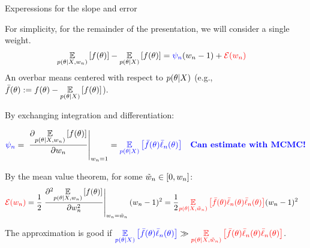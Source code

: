 \begin{frame}[t]{Experessions for the slope and error}


For simplicity, for the remainder of the presentation, we will
consider a single weight.
%
\begin{align*}
%
\expect{p(\theta \vert \xvec, \w_n)}{f(\theta)} -
    \expect{p(\theta \vert \xvec)}{f(\theta)} ={}&
    \blue{\infl_n} (\w_n - 1) + \red{\err(\w_n)}
%
\end{align*}
%
\pause
%
An overbar means centered with respect to $p(\theta \vert X)$
(e.g., $\bar{f}(\theta) := f(\theta) - \underset{p(\theta \vert X)}{\mathbb{E}}\left[f(\theta)\right]$).

\pause
By exchanging integration and differentiation:

\begin{align*}
%
\blue{\infl_n} ={}&
    \fracat{\partial \expect{\p(\theta \vert \xvec, \w_n)}{f(\theta)}}
       {\partial \w_n}{\w_n =1}
= \blue{
\expect{\p(\theta \vert \xvec)}{ \thetabar \ellbar_n(\theta)}
}
& \blue{\textrm{\textbf{Can estimate with MCMC!}}}
\end{align*}
%

\pause
By the mean value theorem, for some $\tilde{w}_n \in [0,w_n]$:
%
\begin{align*}
\red{\err(\w_n)} ={}&
\frac{1}{2}
    \fracat{\partial^2
        \expect{\p(\theta \vert \xvec, \w_n)}{f(\theta)}}
    {\partial \w_n^2}{\w_n=\wtil_n} (\w_n - 1)^2 =
\frac{1}{2}
\red{\expect{\p(\theta \vert \xvec, \wtil_n)}{
    \thetabar
    \ellbar_n(\theta)
    \ellbar_n(\theta)}} (\w_n - 1)^2
%
\end{align*}

\pause
The approximation is good if
$
\textcolor{blue}{
\underset{p(\theta \vert X)}{\mathbb{E}}\left[ \bar{f}(\theta) \bar{\ell}_n(\theta)\right]
} \gg
\textcolor{red}{\underset{p(\theta \vert X, \tilde{w}_n)}{\mathbb{E}}\left[
    \bar{f}(\theta)
    \bar{\ell}_n(\theta)
    \bar{\ell}_n(\theta)\right]}
$.
%
\end{frame}
